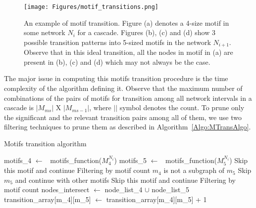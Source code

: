 \documentclass[smallextended]{svjour3}       %
\theoremstyle{definition}
\begin{document}
\begin{figure}[h!]
	\centering
	\texttt{[image: Figures/motif\_transitions.png]}
	\caption{An example of motif transition. Figure (a) denotes a 4-size motif in some network $N_i$ for a cascade. Figures (b), (c) and (d) show 3 possible transition patterns into 5-sized motifs in the network $N_{i+1}$. Observe that in this ideal transition, all the nodes in motif in (a) are present in (b), (c) and (d) which may not always be the case.}
	\label{fig:motifs_transition}
\end{figure}

The major issue in computing this motifs transition procedure is the time complexity of the algorithm defining it. Observe that the maximum number of combinations of the pairs of motifs for transition among all network intervals in a cascade is $|M_{ms}|$ X $ |M_{ms-1}|$, where $||$ symbol denotes the count. To prune only the significant and the relevant transition pairs among all of them, we use two filtering techniques to prune them as described in Algorithm~\ref{Algo:MTransAlgo}.

\begin{algorithm}[t!]
	\caption{Motifs transition algorithm}
	\label{Algo:MTransAlgo}
	\begin{algorithmic}[1]
		\State motifs\_4 $\leftarrow$ \ motifs\_function($M^{N_i}_4$) 
		\State motifs\_5 $\leftarrow$ \ motifs\_function($M^{N_i}_5$) 
		\State Skip this motif and continue \Comment Filtering by motif count				
		\EndIf
		\If $m_4$ is not a subgraph of $m_5$ 
		\State Skip $m_5$ and continue with other motifs 
		\EndIf
		\State Skip this motif and continue \Comment Filtering by motif count				
		\EndIf
		\State nodes\_intersect $\leftarrow$ node\_list\_4 $\cup$ node\_list\_5
		\State transition\_array[m\_4][m\_5] $\leftarrow$ transition\_array[m\_4][m\_5] + 1
		\EndIf
		\EndFor 
		\EndFor 
		\EndFor
		\EndFor
		\EndFor
		\EndProcedure
	\end{algorithmic}
\end{algorithm}
\end{document}
